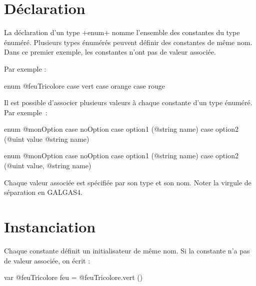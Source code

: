 




\section{Déclaration}

La déclaration d'un type \ggst+enum+ nomme l'ensemble des constantes du type énuméré. Plusieurs types énumérés peuvent définir des constantes de même nom. Dans ce premier exemple, les constantes n'ont pas de valeur associée.

Par exemple :

\begin{galgas34}
enum @feuTricolore {
  case vert
  case orange
  case rouge
}
\end{galgas34}

Il est possible d'associer plusieurs valeurs à chaque constante d'un type énuméré. Par exemple~:

\begin{galgas3}
enum @monOption {
  case noOption
  case option1 (@string name)
  case option2 (@uint value @string name)
}
\end{galgas3}

\begin{galgas4}
enum @monOption {
  case noOption
  case option1 (@string name)
  case option2 (@uint value, @string name)
}
\end{galgas4}

Chaque valeur associée est spécifiée par son type et son nom. Noter la virgule de séparation en GALGAS4.






\section{Instanciation}

Chaque constante définit un initialisateur de même nom. Si la constante n'a pas de valeur associée, on écrit :

\begin{galgas34}
var @feuTricolore feu = @feuTricolore.vert ()
\end{galgas34}

